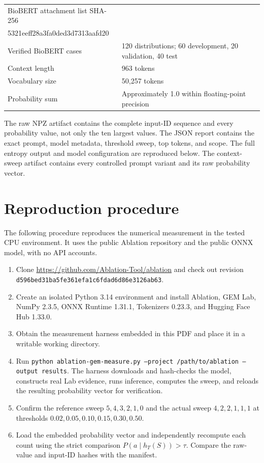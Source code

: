 \documentclass[11pt,a4paper]{article}
\begin{document}
\begin{table}[h]
\begin{tabular}{lp{8cm}}
BioBERT attachment list SHA-256 & \begin{minipage}[t]{8cm}\ttfamily\scriptsize e612fe3b6b0cfdd80c1e02adfb1b233bdb\\5321eeff28a3fa0ded3d7313aafd20\end{minipage} \\
Verified BioBERT cases & 120 distributions; 60 development, 20 validation, 40 test \\
Context length & 963 tokens \\
Vocabulary size & 50,257 tokens \\
Probability sum & Approximately 1.0 within floating-point precision \\
\bottomrule
\end{tabular}
\end{table}

The raw NPZ artifact contains the complete input-ID sequence and every probability value, not only the ten largest values. The JSON report contains the exact prompt, model metadata, threshold sweep, top tokens, and scope. The full entropy output and model configuration are reproduced below. The context-sweep artifact contains every controlled prompt variant and its raw probability vector.

\section{Reproduction procedure}
The following procedure reproduces the numerical measurement in the tested CPU environment. It uses the public Ablation repository and the public ONNX model, with no API accounts.

\begin{enumerate}[nosep]
  \item Clone \url{https://github.com/Ablation-Tool/ablation} and check out revision \texttt{d596bed31ba5fe361efa1c6fdad6d86e3126ab63}.
  \item Create an isolated Python 3.14 environment and install Ablation, GEM Lab, NumPy 2.3.5, ONNX Runtime 1.31.1, Tokenizers 0.23.3, and Hugging Face Hub 1.33.0.
  \item Obtain the measurement harness embedded in this PDF and place it in a writable working directory.
  \item Run \texttt{python ablation-gem-measure.py --project /path/to/ablation --output results}. The harness downloads and hash-checks the model, constructs real Lab evidence, runs inference, computes the sweep, and reloads the resulting probability vector for verification.
  \item Confirm the reference sweep $5,4,3,2,1,0$ and the actual sweep $4,2,2,1,1,1$ at thresholds $0.02,0.05,0.10,0.15,0.30,0.50$.
  \item Load the embedded probability vector and independently recompute each count using the strict comparison $P(a\mid h_T(S))>\tau$. Compare the raw-value and input-ID hashes with the manifest.
\end{enumerate}
\end{document}
